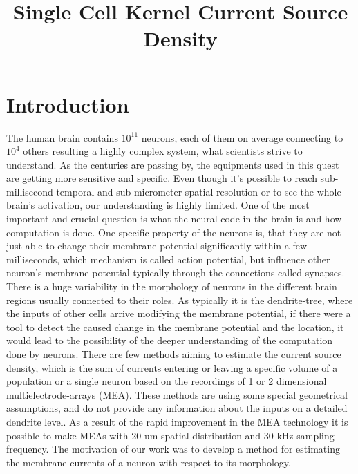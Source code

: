 \documentclass[12pt,a4paper]{article}
\title{Single Cell Kernel Current Source Density}
\begin{document}
\maketitle

\section{Introduction}
The human brain contains $10^{11}$ neurons, each of them on average connecting to $10^4$ others resulting a highly complex system, what scientists strive to understand. As the centuries are passing by, the equipments used in this quest are getting more sensitive and specific. Even though it's possible to reach sub-millisecond  temporal and sub-micrometer spatial resolution or to  see the whole brain's activation, our understanding is highly limited. One of the most important and crucial question is what the neural code in the brain is and how computation is done. One specific property of the neurons is, that they are not just able to change their membrane potential significantly within a few milliseconds, which mechanism is called action potential, but influence other neuron's membrane potential typically through the connections called synapses. There is a huge variability in the morphology of neurons in the different brain regions usually connected to their roles. As typically it is the dendrite-tree, where the inputs of other cells arrive modifying the membrane potential, if there were a tool to detect the caused change in the membrane potential and the location, it would lead to the possibility of the deeper understanding of the computation done by neurons. 
There are few methods aiming to estimate the current source density, which is the sum of currents entering or leaving a specific volume of a population \cite{Nicholson} \cite{DanielW} \cite{iCSD} or a single neuron \cite{Soma} based on the recordings of 1 or 2 dimensional multielectrode-arrays (MEA). These methods are using some special geometrical assumptions, and do not provide any information about the inputs on a detailed dendrite level.
As a result of the rapid improvement in the MEA technology it is possible to make MEAs with 20 um spatial distribution and 30 kHz sampling frequency.
The motivation of our work was to develop a method for estimating the membrane currents of a neuron with respect to its morphology.
\end{document}
